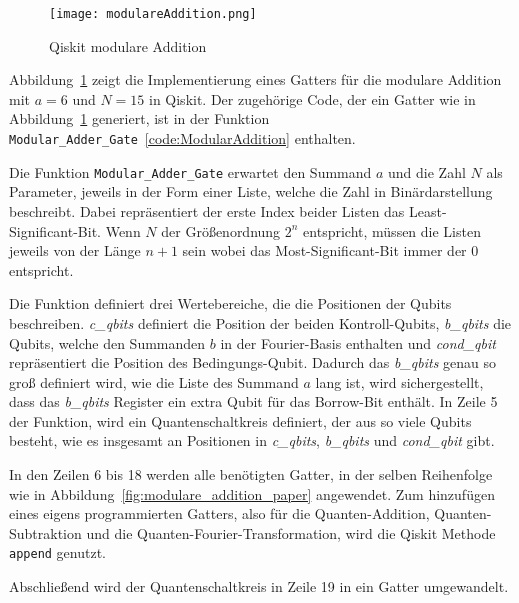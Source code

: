 \begin{figure} [H]
  \caption{Qiskit modulare Addition}
  \label{fig:ModularAddition}
  \texttt{[image: modulareAddition.png]}
  \centering
  \end{figure}

Abbildung~\ref{fig:ModularAddition} zeigt die Implementierung eines Gatters für die modulare Addition 
mit \(a = 6\) und \(N = 15\) in Qiskit.
Der zugehörige Code, der ein Gatter wie in Abbildung~\ref{fig:ModularAddition} generiert, 
ist in der Funktion \texttt{Modular\_Adder\_Gate}~\ref{code:ModularAddition} enthalten.

Die Funktion \texttt{Modular\_Adder\_Gate} erwartet den Summand \(a\) und die Zahl \(N\) als Parameter, 
jeweils in der Form einer Liste, 
welche die Zahl in Binärdarstellung beschreibt.
Dabei repräsentiert der erste Index beider Listen das Least-Significant-Bit.
Wenn \(N\) der Größenordnung \(2^n\) entspricht, 
müssen die Listen jeweils von der Länge \(n+1\) sein wobei das Most-Significant-Bit immer der \(0\) entspricht.

Die Funktion definiert drei Wertebereiche, die die Positionen der Qubits beschreiben.
\textit{c\_qbits} definiert die Position der beiden Kontroll-Qubits, 
\textit{b\_qbits} die Qubits, welche den Summanden \(b\) 
in der Fourier-Basis enthalten 
und \textit{cond\_qbit} repräsentiert die Position des Bedingungs-Qubit.
Dadurch das \textit{b\_qbits} genau so groß definiert wird, 
wie die Liste des Summand \(a\) lang ist, wird sichergestellt, 
dass das \textit{b\_qbits} Register ein extra Qubit für das Borrow-Bit enthält.
In Zeile 5 der Funktion, wird ein Quantenschaltkreis definiert, 
der aus so viele Qubits besteht, wie es insgesamt an Positionen in 
\textit{c\_qbits}, \textit{b\_qbits} und \textit{cond\_qbit} gibt.

In den Zeilen 6 bis 18 werden alle benötigten Gatter, 
in der selben Reihenfolge wie in Abbildung~\ref{fig:modulare_addition_paper} angewendet.
Zum hinzufügen eines eigens programmierten Gatters, 
also für die Quanten-Addition, Quanten-Subtraktion und die Quanten-Fourier-Transformation,
wird die Qiskit Methode \texttt{append} genutzt.

Abschließend wird der Quantenschaltkreis in Zeile 19 in ein Gatter umgewandelt.

